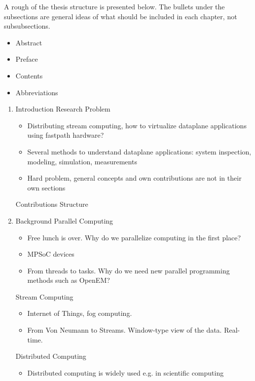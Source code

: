 A rough of the thesis structure is presented below. The bullets under the subsections are general ideas of what should be included in each chapter, not subsubsections.

\begin{itemize}
\item Abstract
\item Preface
\item Contents
\item Abbreviations
\end{itemize}

\begin{enumerate}
\item Introduction
  \subitem Research Problem
  \begin{itemize}[leftmargin=45px]
    \item Distributing stream computing, how to virtualize dataplane applications using fastpath hardware?
    \item Several methods to understand dataplane applications: system inspection, modeling, simulation, measurements
    \item Hard problem, general concepts and own contributions are not in their own sections
  \end{itemize}
  \subitem Contributions
  \subitem Structure

\item Background
  \subitem Parallel Computing
  \begin{itemize}[leftmargin=45px]
    \item Free lunch is over. Why do we parallelize computing in the first place?
    \item MPSoC devices
    \item From threads to tasks. Why do we need new parallel programming methods such as OpenEM?
  \end{itemize}
  \subitem Stream Computing
  \begin{itemize}[leftmargin=45px]
    \item Internet of Things, fog computing.
    \item From Von Neumann to Streams. Window-type view of the data. Real-time.
  \end{itemize}
  \subitem Distributed Computing
  \begin{itemize}[leftmargin=45px]
    \item Distributed computing is widely used e.g. in scientific computing
  \end{itemize}


\end{enumerate}
